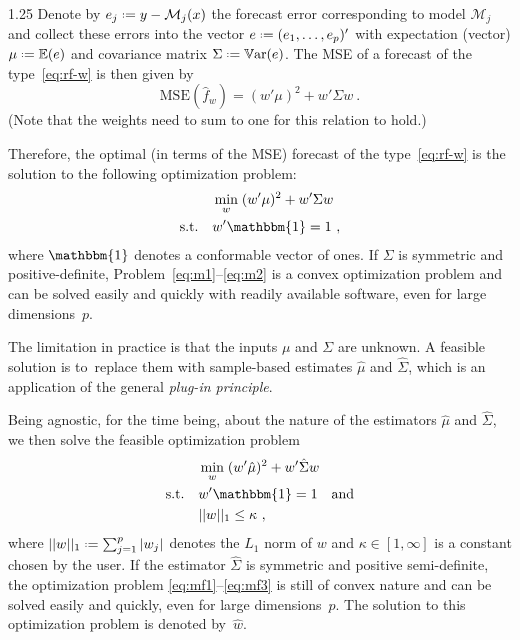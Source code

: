 \documentclass[12pt]{article}
\newcommand*{\defeq}{\mathrel{\vcenter{\baselineskip0.5ex\lineskiplimit0pt\hbox{\scriptsize.}\hbox{\scriptsize.}}}=}
\newcommand{\M}{\mathcal M}
\newcommand{\E}{{\mathbb{E}}}
\newcommand{\V}{{\mathbb{V}\mbox{ar}}}
\newcommand{\bone}{\mathbbm{1}}
\numberwithin{equation}{section}
\theoremstyle{plain}
\begin{document}
\begin{spacing}{1.25}
Denote by $e_j \defeq y - \M_j(x)$ the forecast error corresponding to model $\M_j$
and collect these errors into the vector $e \defeq (e_1, \ldots,
e_p)'$ with expectation (vector) $\mu \defeq \E(e)$ and covariance matrix $\Sigma \defeq \V(e)$.
The MSE of a forecast of the type~\eqref{eq:rf-w} is then given by
$$
\mbox{MSE} (\hat f_w) = (w' \mu)^2 + w' \Sigma w~.
$$
(Note that the weights need to sum to one for this relation to hold.)

Therefore, the optimal (in terms of the MSE) forecast of the 
type~\eqref{eq:rf-w} is the solution to the following optimization problem:
\begin{align}
& \min_w \; (w' \mu)^2 + w' \Sigma w\label{eq:m1} \\
\mbox{s.t.} \quad & w'\bone = 1~, \label{eq:m2}
\end{align}
where $\bone$ denotes a conformable vector of ones. If $\Sigma$ is 
symmetric and positive-definite,
\mbox{Problem \eqref{eq:m1}--\eqref{eq:m2}} is a convex optimization
problem and can be solved easily and quickly with readily
available software, even for large dimensions~$p$.

The limitation in practice is that the inputs $\mu$ and $\Sigma$ are
unknown. A feasible solution is to~replace them with sample-based
estimates $\hat \mu$ and $\hat \Sigma$, which is an application of the general {\em plug-in principle}.


Being agnostic, for the time being, about
the nature of the estimators $\hat \mu$ and $\hat \Sigma$, we then
solve the feasible optimization problem
\begin{align}
& \min_w \; (w' \hat \mu)^2 + w' \hat \Sigma w\label{eq:mf1} \\
  \mbox{s.t.} \quad & w'\bone = 1 \quad \mbox{and} \label{eq:mf2}\\
   \quad & ||w||_1 \le \kappa~, \label{eq:mf3}                   
\end{align}
where 
$||w||_1 \defeq \sum_{j=1}^p |w_j|$ 
denotes the $L_1$ norm of
$w$ and $\kappa \in [1, \infty]$ is a constant chosen by the user.
If the estimator $\hat \Sigma$ is symmetric and
positive semi-definite,
the optimization problem
\eqref{eq:mf1}--\eqref{eq:mf3} is still of convex nature and can
be solved easily and quickly, even for large dimensions~$p$.
The solution to this optimization problem is denoted by~$\hat w$.



\end{spacing}
\end{document}
